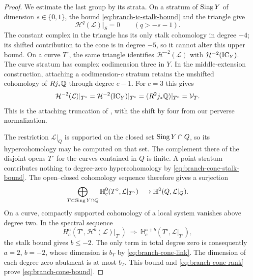 \begin{proof}
We estimate the last group by its strata.  On a stratum of $\operatorname{Sing} Y$
of dimension $s\in\{0,1\}$, the bound
\eqref{eq:branch-ic-stalk-bound} and the triangle give
\begin{equation}\label{eq:branch-cone-stalk-bound}
 \mathcal H^q(\mathcal L)|_S=0\qquad(q>-s-1).
\end{equation}
The constant complex in the triangle has its only stalk cohomology
in degree $-4$; its shifted contribution to the cone is in degree
$-5$, so it cannot alter this upper bound.  On a curve $T^\circ$,
the same triangle identifies $\mathcal H^{-2}(\mathcal L)$ with
$\mathcal H^{-2}(\operatorname{IC}_Y)$.  The curve stratum has complex codimension
three in $Y$.  In the middle-extension construction, attaching a
codimension-$c$ stratum retains the unshifted cohomology of $Rj_*\mathbb{Q}$
through degree $c-1$.  For $c=3$ this gives
\begin{equation}\label{eq:branch-cone-link}
 \mathcal H^{-2}(\mathcal L)|_{T^\circ}
   =\mathcal H^{-2}(\operatorname{IC}_Y)|_{T^\circ}
   =(R^2j_*\mathbb{Q})|_{T^\circ}=\mathcal V_T.
\end{equation}
This is the attaching truncation of
\cite[Section~3.1 and Section~3.3, Axiom {\rm[AX1]}(d)]{GoreskyMacPhersonIHII},
with the shift by four from our perverse normalization.

The restriction $\mathcal L|_Q$ is supported on the closed set
$\operatorname{Sing} Y\cap Q$, so its hypercohomology may be computed on that set.
The complement there of the disjoint opens $T^\circ$
for the curves contained in $Q$ is finite.  A point stratum contributes
nothing to degree-zero hypercohomology by
\eqref{eq:branch-cone-stalk-bound}.  The open--closed cohomology
sequence therefore gives a surjection
\[
 \bigoplus_{T\subset\operatorname{Sing} Y\cap Q}
       \mathbb H_c^0(T^\circ,\mathcal L|_{T^\circ})
       \longrightarrow\mathbb H^0(Q,\mathcal L|_Q).
\]
On a curve, compactly supported cohomology of a local system vanishes
above degree two.  In the spectral sequence
\[
 H_c^a(T^\circ,\mathcal H^b(\mathcal L)|_{T^\circ})
       \ \Longrightarrow\ 
 \mathbb H_c^{a+b}(T^\circ,\mathcal L|_{T^\circ}),
\]
the stalk bound gives $b\leq-2$.  The only term in total degree zero
is consequently $a=2$, $b=-2$, whose dimension is $b_T$ by
\eqref{eq:branch-cone-link}.  The dimension of each degree-zero
abutment is at most $b_T$.  This bound and
\eqref{eq:branch-cone-rank} prove \eqref{eq:branch-cone-bound}.
\end{proof}

